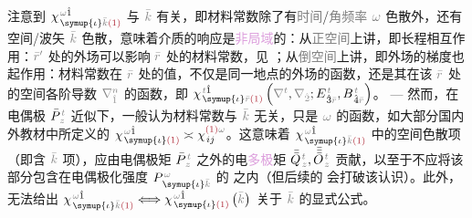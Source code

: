 注意到 $\chi^{\;\! \mathcolor{gray}{\omega} \hat{1}}_{\;\! \symup{\iota} \mathcolor{gray}{\bar{k}} \textcolor{Maroon}{(1)}}$ 与 $\mathcolor{gray}{\bar{k}}$ 有关，即材料常数除了有\textcolor{gray}{时间}/\textcolor{gray}{角频率} $\mathcolor{gray}{\omega}$ \textcolor{NavyBlue}{色散}外，还有空间/\textcolor{PineGreen}{波矢} $\mathcolor{gray}{\bar{k}}$ \textcolor{NavyBlue}{色散}，意味着介质的响应是\textcolor{Plum}{非局域}的：从\textcolor{gray}{正空间}上讲，即长程相互作用：$\mathcolor{gray}{\bar{r}'}$ 处的外场可以影响 $\mathcolor{gray}{\bar{r}}$ 处的材料常数，见 ；从\textcolor{gray}{倒空间}上讲，即外场的梯度也起作用：材料常数在 $\mathcolor{gray}{\bar{r}}$ 处的值，不仅是同一地点的外场的函数，还是其在该 $\mathcolor{gray}{\bar{r}}$ 处的空间各阶导数 $\mathcolor{gray}{\nabla^n_{\hat{1}}}$ 的函数，即 $\chi^{\;\! \mathcolor{gray}{t} \hat{1}}_{\;\! \symup{\iota} \mathcolor{gray}{\bar{r}} \textcolor{Maroon}{(1)}} \left( \mathcolor{gray}{\nabla^t}, \mathcolor{gray}{\nabla_{\hat{2}}} ; E^{\;\!\mathcolor{gray}{t}}_{\;\! \hat{3}\mathcolor{gray}{\bar{r}}}, B^{\;\!\mathcolor{gray}{t}}_{\;\! \hat{4}\mathcolor{gray}{\bar{r}}} \right)$。 ---  然而，在电偶极 $\bar{P}^{\;\!\mathcolor{gray}{t}}_{\;\!\mathcolor{gray}{z}}$ 近似下，一般认为材料常数与 $\mathcolor{gray}{\bar{k}}$ 无关，只是 $\mathcolor{gray}{\omega}$ 的函数，如大部分国内外教材中所定义的 $\chi^{\;\! \mathcolor{gray}{\omega} \hat{1}}_{\;\! \symup{\iota} \textcolor{Maroon}{(1)}} \asymp \chi^{ \textcolor{Maroon}{(1)} \mathcolor{gray}{\omega}}_{\;\! ij}$。这意味着 $\chi^{\;\! \mathcolor{gray}{\omega} \hat{1}}_{\;\! \symup{\iota} \mathcolor{gray}{\bar{k}} \textcolor{Maroon}{(1)}}$ 中的空间\textcolor{NavyBlue}{色散}项（即含 $\mathcolor{gray}{\bar{k}}$ 项），应由电偶极矩 $\bar{P}^{\;\!\mathcolor{gray}{t}}_{\;\!\mathcolor{gray}{z}}$ 之外的电\textcolor{Plum}{多极}矩 $\bar{\bar{Q}}^{\;\!\mathcolor{gray}{t}}_{\;\!\mathcolor{gray}{z}},\bar{\bar{\bar{O}}}^{\;\!\mathcolor{gray}{t}}_{\;\!\mathcolor{gray}{z}}$ 贡献\cite{shenNonlinearOpticalSusceptibilities2001}，以至于不应将该部分包含在电偶极化强度 $P^{\;\!\mathcolor{gray}{\omega}}_{\;\! \symup{\iota}\mathcolor{gray}{\bar{k}}}$ 的  之内（但后续的  会打破该认识）。此外， 无法给出 $\chi^{\;\! \mathcolor{gray}{\omega} \hat{1}}_{\;\! \symup{\iota} \mathcolor{gray}{\bar{k}} \textcolor{Maroon}{(1)}} \Longleftrightarrow \chi^{\;\! \mathcolor{gray}{\omega} \hat{1}}_{\;\! \symup{\iota} \textcolor{Maroon}{(1)}} \left( \mathcolor{gray}{\bar{k}} \right)$ 关于 $\mathcolor{gray}{\bar{k}}$ 的显式公式。

